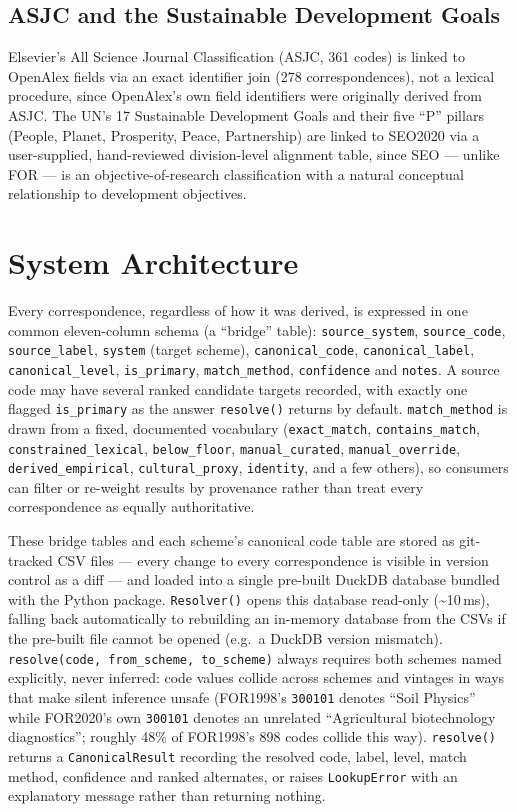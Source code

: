 \documentclass[11pt]{article}
\begin{document}
\subsection{ASJC and the Sustainable Development Goals}

Elsevier's All Science Journal Classification (ASJC, 361 codes) is linked to OpenAlex
fields via an exact identifier join (278 correspondences), not a lexical procedure,
since OpenAlex's own field identifiers were originally derived from ASJC. The UN's 17
Sustainable Development Goals and their five ``P'' pillars (People, Planet, Prosperity,
Peace, Partnership) are linked to SEO2020 via a user-supplied, hand-reviewed
division-level alignment table, since SEO --- unlike FOR --- is an objective-of-research
classification with a natural conceptual relationship to development objectives.

\section{System Architecture}
\label{sec:architecture}

Every correspondence, regardless of how it was derived, is expressed in one common
eleven-column schema (a ``bridge'' table): \texttt{source\_system}, \texttt{source\_code},
\texttt{source\_label}, \texttt{system} (target scheme), \texttt{canonical\_code},
\texttt{canonical\_label}, \texttt{canonical\_level}, \texttt{is\_primary},
\texttt{match\_method}, \texttt{confidence} and \texttt{notes}. A source code may have
several ranked candidate targets recorded, with exactly one flagged \texttt{is\_primary}
as the answer \texttt{resolve()} returns by default. \texttt{match\_method} is drawn from a
fixed, documented vocabulary (\texttt{exact\_match}, \texttt{contains\_match},
\texttt{constrained\_lexical}, \texttt{below\_floor}, \texttt{manual\_curated},
\texttt{manual\_override}, \texttt{derived\_empirical}, \texttt{cultural\_proxy},
\texttt{identity}, and a few others), so consumers can filter or re-weight results by
provenance rather than treat every correspondence as equally authoritative.

These bridge tables and each scheme's canonical code table are stored as git-tracked CSV
files --- every change to every correspondence is visible in version control as a diff
--- and loaded into a single pre-built DuckDB database bundled with the Python package.
\texttt{Resolver()} opens this database read-only (\textasciitilde10\,ms), falling back
automatically to rebuilding an in-memory database from the CSVs if the pre-built file
cannot be opened (e.g.\ a DuckDB version mismatch). \texttt{resolve(code, from\_scheme,
to\_scheme)} always requires both schemes named explicitly, never inferred: code values
collide across schemes and vintages in ways that make silent inference unsafe (FOR1998's
\texttt{300101} denotes ``Soil Physics'' while FOR2020's own \texttt{300101} denotes an
unrelated ``Agricultural biotechnology diagnostics''; roughly 48\% of FOR1998's 898 codes
collide this way). \texttt{resolve()} returns a \texttt{CanonicalResult} recording the
resolved code, label, level, match method, confidence and ranked alternates, or raises
\texttt{LookupError} with an explanatory message rather than returning nothing.
\end{document}
